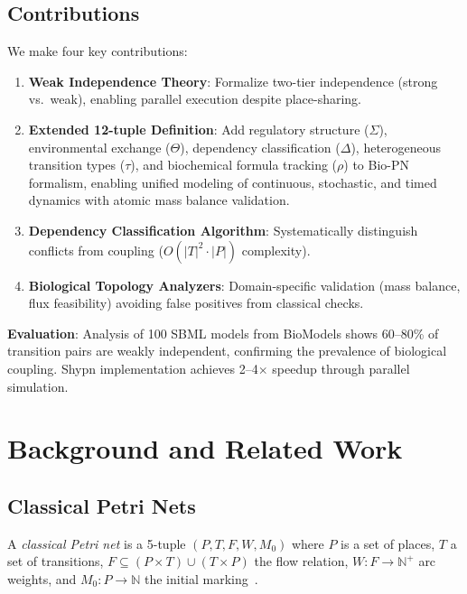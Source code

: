 \documentclass[runningheads]{llncs}
\begin{document}
\subsection{Contributions}

We make four key contributions:

\begin{enumerate}
    \item \textbf{Weak Independence Theory}: Formalize two-tier independence (strong vs.\ weak), enabling parallel execution despite place-sharing.
    
    \item \textbf{Extended 12-tuple Definition}: Add regulatory structure ($\Sigma$), environmental exchange ($\Theta$), dependency classification ($\Delta$), heterogeneous transition types ($\tau$), and biochemical formula tracking ($\rho$) to Bio-PN formalism, enabling unified modeling of continuous, stochastic, and timed dynamics with atomic mass balance validation.
    
    \item \textbf{Dependency Classification Algorithm}: Systematically distinguish conflicts from coupling ($O(|T|^2 \cdot |P|)$ complexity).
    
    \item \textbf{Biological Topology Analyzers}: Domain-specific validation (mass balance, flux feasibility) avoiding false positives from classical checks.
\end{enumerate}

\textbf{Evaluation}: Analysis of 100 SBML models from BioModels shows 60--80\% of transition pairs are weakly independent, confirming the prevalence of biological coupling. Shypn implementation achieves 2--4$\times$ speedup through parallel simulation.

\section{Background and Related Work}

\subsection{Classical Petri Nets}

A \emph{classical Petri net} is a 5-tuple $(P, T, F, W, M_0)$ where $P$ is a set of places, $T$ a set of transitions, $F \subseteq (P \times T) \cup (T \times P)$ the flow relation, $W: F \to \mathbb{N}^+$ arc weights, and $M_0: P \to \mathbb{N}$ the initial marking~\cite{Murata1989}.
\end{document}
